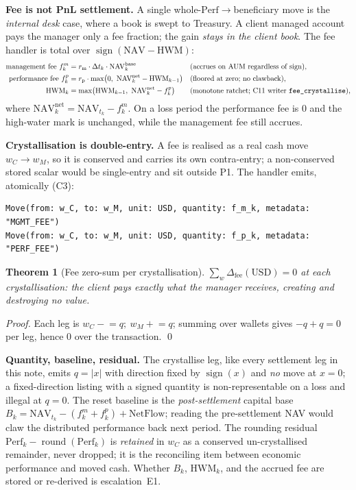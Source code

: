 \documentclass[11pt,a4paper]{article}
\newtheorem{theorem}[definition]{Theorem}
\begin{document}
\noindent\textbf{Fee is not PnL settlement.} A single whole-$\mathrm{Perf}\to$beneficiary move is
the \emph{internal desk} case, where a book is swept to Treasury. A client managed account pays
the manager only a fee fraction; the gain \emph{stays in the client book}. The fee handler is
total over $\operatorname{sign}(\mathrm{NAV}-\mathrm{HWM})$:
\begin{align*}
\text{management fee } f^{m}_k &= r_{\text{m}}\cdot\Delta t_k\cdot \mathrm{NAV}^{\text{base}}_k
&&\text{(accrues on AUM regardless of sign),}\\
\text{performance fee } f^{p}_k &= r_{\text{p}}\cdot\max\!\big(0,\ \mathrm{NAV}^{\text{net}}_k-\mathrm{HWM}_{k-1}\big)
&&\text{(floored at zero; no clawback),}\\
\mathrm{HWM}_k &= \max\!\big(\mathrm{HWM}_{k-1},\ \mathrm{NAV}^{\text{net}}_k-f^{p}_k\big)
&&\text{(monotone ratchet; C11 writer \texttt{fee\_crystallise}),}
\end{align*}
where $\mathrm{NAV}^{\text{net}}_k=\mathrm{NAV}_{t_k}-f^{m}_k$. On a loss period the performance
fee is $0$ and the high-water mark is unchanged, while the management fee still accrues.

\noindent\textbf{Crystallisation is double-entry.} A fee is realised as a real cash move
$w_C\to w_M$, so it is conserved and carries its own contra-entry; a non-conserved stored scalar
would be single-entry and sit outside P1. The handler emits, atomically (C3):
\begin{lstlisting}
Move(from: w_C, to: w_M, unit: USD, quantity: f_m_k, metadata: "MGMT_FEE")
Move(from: w_C, to: w_M, unit: USD, quantity: f_p_k, metadata: "PERF_FEE")
\end{lstlisting}
\begin{theorem}[Fee zero-sum per crystallisation]
$\sum_w \Delta_{\text{fee}}(\text{USD})=0$ at each crystallisation: the client pays exactly what
the manager receives, creating and destroying no value.
\end{theorem}
\noindent\textit{Proof.} Each leg is $w_C\mathbin{-}\!=q;\ w_M\mathbin{+}\!=q$; summing over
wallets gives $-q+q=0$ per leg, hence $0$ over the transaction. \qed

\noindent\textbf{Quantity, baseline, residual.} The crystallise leg, like every settlement leg in
this note, emits $q=|x|$ with direction fixed by $\operatorname{sign}(x)$ and \emph{no} move at
$x=0$; a fixed-direction listing with a signed quantity is non-representable on a loss and illegal
at $q=0$. The reset baseline is the \emph{post-settlement} capital base
$B_k=\mathrm{NAV}_{t_k}-(f^{m}_k+f^{p}_k)+\mathrm{NetFlow}$; reading the pre-settlement NAV would
claw the distributed performance back next period. The rounding residual
$\mathrm{Perf}_k-\operatorname{round}(\mathrm{Perf}_k)$ is \emph{retained} in $w_C$ as a conserved
un-crystallised remainder, never dropped; it is the reconciling item between economic performance
and moved cash. Whether $B_k$, $\mathrm{HWM}_k$, and the
accrued fee are stored or re-derived is escalation~E1.
\end{document}
